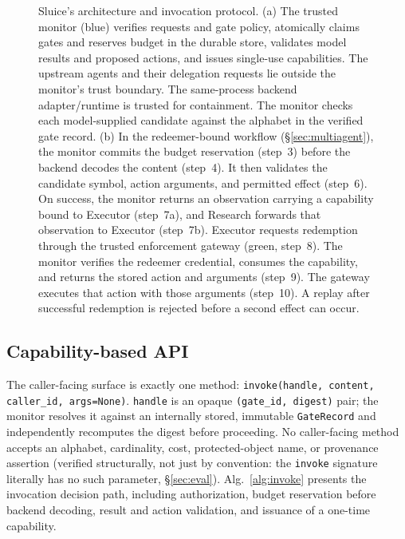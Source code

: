 \documentclass[conference,compsoc]{IEEEtran}
\begin{document}
\begin{figure}
{}
\caption{Sluice's architecture and invocation protocol. (a) The trusted monitor (blue) verifies requests and gate policy, atomically claims gates and reserves budget in the durable store, validates model results and proposed actions, and issues single-use capabilities. The upstream agents and their delegation requests lie outside the monitor's trust boundary. The same-process backend adapter/runtime is trusted for containment. The monitor checks each model-supplied candidate against the alphabet in the verified gate record. (b) In the redeemer-bound workflow (\S\ref{sec:multiagent}), the monitor commits the budget reservation (step~3) before the backend decodes the content (step~4). It then validates the candidate symbol, action arguments, and permitted effect (step~6). On success, the monitor returns an observation carrying a capability bound to Executor (step~7a), and Research forwards that observation to Executor (step~7b). Executor requests redemption through the trusted enforcement gateway (green, step~8). The monitor verifies the redeemer credential, consumes the capability, and returns the stored action and arguments (step~9). The gateway executes that action with those arguments (step~10). A replay after successful redemption is rejected before a second effect can occur.}
\label{fig:architecture}
\end{figure}






\subsection{Capability-based API}
The caller-facing surface is exactly one method:
\texttt{invoke(handle, content, caller\_id, args=None)}. \texttt{handle} is an opaque
\texttt{(gate\_id, digest)} pair; the monitor resolves it against an
internally stored, immutable \texttt{GateRecord} and independently
recomputes the digest before proceeding. No caller-facing method accepts
an alphabet, cardinality, cost, protected-object name, or provenance
assertion (verified structurally, not just by convention: the
\texttt{invoke} signature literally has no such parameter,
\S\ref{sec:eval}). {Alg.~\ref{alg:invoke} presents the invocation decision path, including authorization, budget reservation before backend decoding, result and action validation, and issuance of a one-time capability.}
\end{document}
